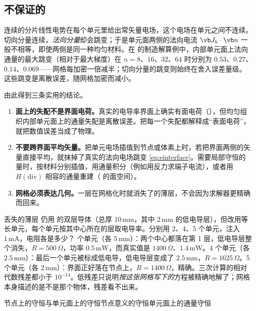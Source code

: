 \subsection{不保证的}
连续的分片线性电势在每个单元里给出常矢量电场，这个电场在单元之间不连续。切向分量连续，\emph{法向分量}却会跳变；于是单元面两侧的法向电流 $\vb J_h\cdot\vb n$ 一般不相等，即使两侧是同一种均匀材料。在 的制造解算例中，内部单元面上法向通量的最大跳变（相对于最大梯度）在 $n=8$、$16$、$32$、$64$ 时分别为 $0.53$、$0.27$、$0.14$、$0.069$——网格每加密一倍减半；切向分量的跳变则始终在舍入误差量级。这些跳变是离散误差，随网格加密而减小。

由此得到三条实用的结论。
\begin{enumerate}
\item \textbf{面上的失配不是界面电荷。}真实的电导率界面上确实有面电荷（），但均匀组织内部单元面上的通量失配是离散误差。把每一个失配都解释成“表面电荷”，就把数值误差当成了物理。
\item \textbf{不要跨界面平均矢量。}把单元电场插值到节点或体素上时，若把界面两侧的矢量直接平均，就抹掉了真实的法向电场跳变 \eqref{eq:einterface}。需要局部守恒的量时，按材料分别插值，用通量积分（例如用反力求端子电流），或者用 $H(\mathrm{div})$ 相容的通量重建（ 的面空间）。
\item \textbf{网格必须表达几何。}一层在网格化时就消失了的薄层，不会因为求解器更精确而回来。
\end{enumerate}

\begin{example}[label=ex:femscalar-thinlayer]{丢失的薄层}
仍用 的双层导体（总厚 $10\,\mathrm{mm}$，其中 $2\,\mathrm{mm}$ 的低电导层），但改用等长单元，每个单元按其中心所在的层取电导率。分别用 2、4、5 个单元，注入 $1\,\mathrm{mA}$，电阻各是多少？
 个单元（各 $5\,\mathrm{mm}$）：两个中心都落在第 1 层，低电导层整个消失，$R=500\,\Omega$，功率 $0.5\,\mathrm{mW}$，而真实值是 $1400\,\Omega$、$1.4\,\mathrm{mW}$。4 个单元（各 $2.5\,\mathrm{mm}$）：最后一个单元被标成低电导，低电导层变成了 $2.5\,\mathrm{mm}$，$R=1625\,\Omega$。5 个单元（各 $2\,\mathrm{mm}$）：界面正好落在节点上，$R=1400\,\Omega$，精确。三次计算的相对代数残差都小于 $10^{-14}$。低残差只说明\emph{按这张网格写下的}方程被精确地解了；网格本身描述的是不是那个物体，残差看不出来。
\end{example}

\begin{compare}{节点上的守恒与单元面上的守恒}{节点意义的守恒}{单元面上的通量守恒}
\end{compare}

